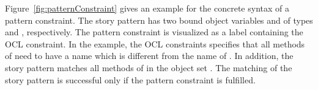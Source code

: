{

Figure~\ref{fig:patternConstraint} gives an example for the concrete syntax of a pattern constraint. The story pattern has two bound object variables  and  of types  and , respectively. The pattern constraint is visualized as a label containing the OCL constraint. In the example, the OCL constraints specifies that all methods of  need to have a name which is different from the name of . In addition, the story pattern matches all methods of  in the object set . The matching of the story pattern is successful only if the pattern constraint is fulfilled.

} %


